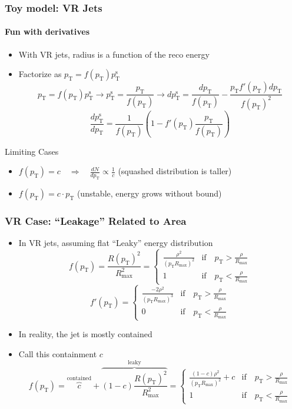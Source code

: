 \documentclass[xcolor={table}]{beamer}
\newcommand{\pt}{p_{\mathrm{T}}}
\newcommand{\ptr}{\pt}
\newcommand{\ptt}{\pt^{\text{s}}}
\begin{document}
\begin{frame}
  \frametitle{Toy model: VR Jets}
  \framesubtitle{Fun with derivatives}
  \begin{itemize}
  \item With VR jets, radius is a function of the reco energy
  \item Factorize as $\boxed{\ptr = f(\ptr) \ptt}$
    \[ \ptr = f(\ptr) \ptt \to \ptt = \frac{\ptr}{f(\ptr)} \to d\ptt = \frac{d\ptr}{f(\ptr)} - \frac{\ptr f'(\ptr) d\ptr}{f(\ptr)^2} \]
    \[ \boxed{ \frac{d\ptt}{d\ptr} = \frac{1}{f(\ptr)} \left( 1 - f'(\ptr) \frac{\ptr}{f(\ptr)} \right) } \]
  \end{itemize}
  \begin{block}{Limiting Cases}
    \begin{itemize}
    \item $f(\ptr) = c \quad \Rightarrow \quad \frac{dN}{d\ptr} \propto \frac{1}{c}$ (squashed distribution is taller)
    \item $f(\ptr) = c \cdot \ptr$ (unstable, energy grows without bound)
    \end{itemize}
  \end{block}
\end{frame}

\begin{frame}
  \frametitle{VR Case: ``Leakage'' Related to Area}
  \begin{itemize}
  \item In VR jets, assuming flat ``Leaky'' energy distribution
    \[ f(\ptr) = \frac{R(\ptr)^{2}}{R^{2}_{\text{max}}} = \begin{cases}
      \frac{ \rho^2 }{(\ptr R_{\text{max}})^2}  &\text{if}\quad \ptr > \frac{\rho}{R_{\text{max}}}\\
       1 &\text{if}\quad  \ptr <  \frac{\rho}{R_{\text{max}}}
    \end{cases}
      \]
    \[ f'(\ptr) = \begin{cases}
      \frac{-2 \rho^2 }{(\ptr R_{\text{max}})^3}  &\text{if}\quad \ptr > \frac{\rho}{R_{\text{max}}}\\
      0 &\text{if}\quad  \ptr <  \frac{\rho}{R_{\text{max}}}
    \end{cases}
    \]
  \item In reality, the jet is mostly contained
  \item Call this containment $c$
    \[ f(\ptr) = \overbrace{c}^{\text{contained}} + \overbrace{(1-c) \frac{R(\ptr)^{2}}{R^{2}_{\text{max}}}}^{\text{leaky}} = \begin{cases}
      \frac{ (1-c) \rho^2 }{(\ptr R_{\text{max}})^2} + c  &
      \text{if}\quad \ptr > \frac{\rho}{R_{\text{max}}} \\
      1 & \text{if}\quad  \ptr <  \frac{\rho}{R_{\text{max}}}
    \end{cases}
      \]
  \end{itemize}
\end{frame}
\end{document}
